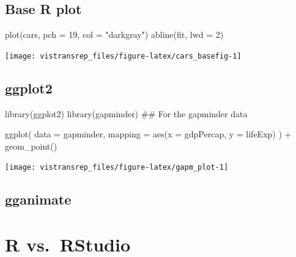 \documentclass[]{book}
\newenvironment{Shaded}{}{}
\newcommand{\DataTypeTok}[1]{#1}
\newcommand{\DecValTok}[1]{#1}
\newcommand{\KeywordTok}[1]{\textcolor[rgb]{0.00,0.00,1.00}{#1}}
\newcommand{\NormalTok}[1]{#1}
\newcommand{\OperatorTok}[1]{#1}
\newcommand{\StringTok}[1]{\textcolor[rgb]{0.00,0.50,0.50}{#1}}
\begin{document}
\hypertarget{base-r-plot}{%
\subsection{Base R plot}\label{base-r-plot}}

\begin{Shaded}
\begin{Highlighting}[]
\KeywordTok{plot}\NormalTok{(cars, }\DataTypeTok{pch =} \DecValTok{19}\NormalTok{, }\DataTypeTok{col =} \StringTok{"darkgray"}\NormalTok{)}
\KeywordTok{abline}\NormalTok{(fit, }\DataTypeTok{lwd =} \DecValTok{2}\NormalTok{)}
\end{Highlighting}
\end{Shaded}

\begin{flushright}\texttt{[image: vistransrep\_files/figure-latex/cars\_basefig-1]} \end{flushright}

\hypertarget{ggplot2}{%
\subsection{ggplot2}\label{ggplot2}}

\begin{Shaded}
\begin{Highlighting}[]
\KeywordTok{library}\NormalTok{(ggplot2)}
\KeywordTok{library}\NormalTok{(gapminder) ## For the gapminder data}

\KeywordTok{ggplot}\NormalTok{(}
  \DataTypeTok{data =}\NormalTok{ gapminder,}
  \DataTypeTok{mapping =} \KeywordTok{aes}\NormalTok{(}\DataTypeTok{x =}\NormalTok{ gdpPercap, }\DataTypeTok{y =}\NormalTok{ lifeExp)}
\NormalTok{) }\OperatorTok{+}
\StringTok{  }\KeywordTok{geom_point}\NormalTok{()}
\end{Highlighting}
\end{Shaded}

\begin{flushright}\texttt{[image: vistransrep\_files/figure-latex/gapm\_plot-1]} \end{flushright}

\hypertarget{gganimate}{%
\subsection{gganimate}\label{gganimate}}

\hypertarget{r-vs.rstudio}{%
\section{R vs.~RStudio}\label{r-vs.rstudio}}
\end{document}

